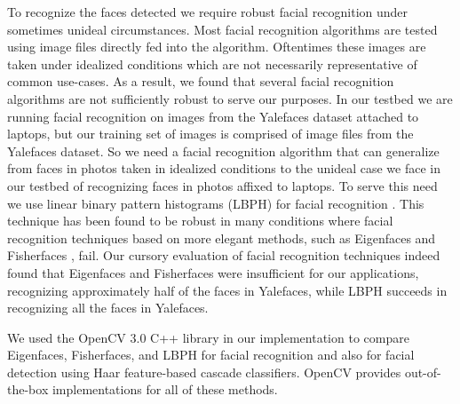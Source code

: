 \documentclass[12pt]{report}
\begin{document}
To recognize the faces detected we require robust facial recognition under sometimes unideal circumstances. Most facial recognition algorithms are tested using image files directly fed into the algorithm. Oftentimes these images are taken under idealized conditions which are not necessarily representative of common use-cases. As a result, we found that several facial recognition algorithms are not sufficiently robust to serve our purposes. In our testbed we are running facial recognition on images from the Yalefaces dataset attached to laptops, but our training set of images is comprised of image files from the Yalefaces \cite{FisherfacesBelhumeur1997} dataset. So we need a facial recognition algorithm that can generalize from faces in photos taken in idealized conditions to the unideal case we face in our testbed of recognizing faces in photos affixed to laptops. To serve this need we use linear binary pattern histograms (LBPH) for facial recognition \cite{LBPHAhonen2004,LearningMultiScalBlockLBPHLiao2007}. This technique has been found to be robust in many conditions where facial recognition techniques based on more elegant methods, such as Eigenfaces \cite{EigenfacesTurk1991} and Fisherfaces \cite{FisherfacesBelhumeur1997}, fail. Our cursory evaluation of facial recognition techniques indeed found that Eigenfaces and Fisherfaces were insufficient for our applications, recognizing approximately half of the faces in Yalefaces, while LBPH succeeds in recognizing all the faces in Yalefaces. \par

We used the OpenCV 3.0 \cite{OpenCV} C++ library in our implementation to compare Eigenfaces, Fisherfaces, and LBPH for facial recognition and also for facial detection using Haar feature-based cascade classifiers. OpenCV provides out-of-the-box implementations for all of these methods. \par
\end{document}
